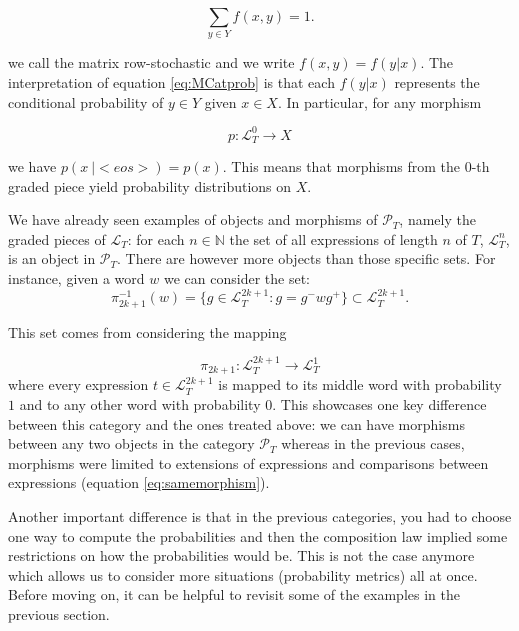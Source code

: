 \documentclass[10pt,a4paper]{elsarticle}
\renewcommand{\Bbb}{\mathbb}
\newcommand{\N}{\Bbb{N}}
\renewcommand{\L}{\mathcal{L}}
\renewcommand{\P}{\mathcal{P}}
\begin{document}
\begin{equation}\label{eq:MCatprob}
	\sum_{y\in Y}f(x,y)=1.
\end{equation}

we call the matrix row-stochastic and we write $f(x,y)=f(y|x)$.
The interpretation of equation \eqref{eq:MCatprob} is that each $f(y|x)$ represents the conditional probability of $y\in Y$ given $x\in X$. In particular, for any morphism 

\begin{equation}
	p\colon \L_{T}^{0}\to X
\end{equation}

we have $p(x \ |<eos>)=p(x)$. This means that morphisms from the $0$-th graded piece yield probability distributions on $X$.

We have already seen examples of objects and morphisms of $\P_{T}$, namely the graded pieces of $\L_{T}$: for each $n\in\N$ the set of all expressions of length $n$ of $T$, $\L_{T}^{n}$, is an object in $\P_{T}$. There are however more objects than those specific sets. For instance, given a word $w$ we can consider the set:
\begin{equation}
	\pi^{-1}_{2k+1}(w)=\{g\in \L_{T}^{2k+1}\colon g=g^{-}wg^{+}\}\subset \L_{T}^{2k+1}.
\end{equation}

This set comes from considering the mapping

\begin{equation}
	\pi_{2k+1}\colon\L_{T}^{2k+1}\to\L_{T}^{1}
\end{equation}
where every expression $t\in \L_{T}^{2k+1}$ is mapped to its middle word with probability $1$ and to any other word with probability $0$.  This showcases one key difference between this category and the ones treated above: we can have morphisms between any two objects in the category $\P_{T}$ whereas in the previous cases, morphisms were limited to extensions of expressions and comparisons between expressions (equation \eqref{eq:samemorphism}).


Another important difference is that in the previous categories, you had to choose one way to compute the probabilities and then the composition law implied some restrictions on how the probabilities would be. This is not the case anymore which allows us to consider more situations (probability metrics) all at once. Before moving on, it can be helpful to revisit some of the examples in the previous section.
\end{document}
